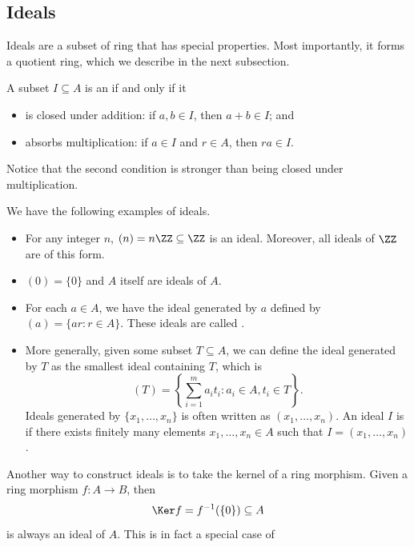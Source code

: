 \subsection{Ideals}
Ideals are a subset of ring that has special properties.
Most importantly, it forms a quotient ring, which we 
describe in the next subsection.
\begin{definition}[Ideal]
A subset $I\subseteq A$ is an  if and only if it
\begin{itemize}
    \item is closed under addition:
	if $a,b\in I$, then $a+b\in I$; and
    \item absorbs multiplication:
	if $a\in I$ and $r\in A$, then $ra\in I$.
\end{itemize}
\end{definition}
Notice that the second condition is stronger than 
being closed under multiplication.
\begin{example}
    We have the following examples of ideals.
    \begin{itemize}
	\item For any integer $n$, 
        $(n) = n\ZZ\subseteq \ZZ$ is an ideal.
        Moreover, all ideals of $\ZZ$ are of this form.
	\item $(0)=\{0\}$ and $A$ itself are ideals of $A$.
	\item For each $a\in A$,
	    we have the ideal 
	    generated by $a$ defined by
	    $(a) = \{ar : r\in A\}$.
	    These ideals are called .
	\item More generally, given some subset $T\subseteq A$,
	    we can define the ideal generated by $T$
	    as the smallest ideal containing $T$, which is
	    $$(T) = \left\{\sum_{i=1}^m a_it_i : 
	    a_i\in A, t_i\in T\right\}.$$
            Ideals generated by $\{x_1,\dots,x_n\}$
            is often written as $(x_1,\dots,x_n)$.
        An ideal $I$ is  if 
        there exists finitely many elements $x_1,\dots,x_n\in A$ such that 
        $I=(x_1,\dots,x_n)$.
    \end{itemize}
\end{example}
Another way to construct ideals is to take the kernel
of a ring morphism.
Given a ring morphism $f : A\to B$, then
$$\Ker f= f^{-1}(\{0\})\subseteq A$$
is always an ideal of $A$.
This is in fact a special case of
